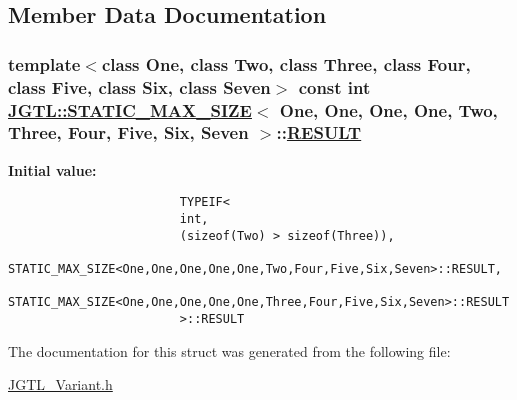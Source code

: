 \subsection{Member Data Documentation}
\hypertarget{struct_j_g_t_l_1_1_s_t_a_t_i_c___m_a_x___s_i_z_e_3_01_one_00_01_one_00_01_one_00_01_one_00_01_tw5a2eea924c533f564bf1050b20ef91fc_3251caeab0b9ba2e6d92f12729bc8d67}{
\subsubsection[RESULT]{\setlength{\rightskip}{0pt plus 5cm}template$<$class One, class Two, class Three, class Four, class Five, class Six, class Seven$>$ const int \hyperlink{struct_j_g_t_l_1_1_s_t_a_t_i_c___m_a_x___s_i_z_e}{JGTL::STATIC\_\-MAX\_\-SIZE}$<$ One, One, One, One, Two, Three, Four, Five, Six, Seven $>$::\hyperlink{struct_j_g_t_l_1_1_s_t_a_t_i_c___m_a_x___s_i_z_e_3_01_one_00_01_one_00_01_one_00_01_one_00_01_tw5a2eea924c533f564bf1050b20ef91fc_3251caeab0b9ba2e6d92f12729bc8d67}{RESULT}}}
\label{struct_j_g_t_l_1_1_s_t_a_t_i_c___m_a_x___s_i_z_e_3_01_one_00_01_one_00_01_one_00_01_one_00_01_tw5a2eea924c533f564bf1050b20ef91fc_3251caeab0b9ba2e6d92f12729bc8d67}


\textbf{Initial value:}

\begin{Code}\begin{verbatim}
                        TYPEIF<
                        int,
                        (sizeof(Two) > sizeof(Three)),
                        STATIC_MAX_SIZE<One,One,One,One,One,Two,Four,Five,Six,Seven>::RESULT,
                        STATIC_MAX_SIZE<One,One,One,One,One,Three,Four,Five,Six,Seven>::RESULT
                        >::RESULT
\end{verbatim}\end{Code}


The documentation for this struct was generated from the following file:\begin{CompactItemize}
\item 
\hyperlink{_j_g_t_l___variant_8h}{JGTL\_\-Variant.h}\end{CompactItemize}
